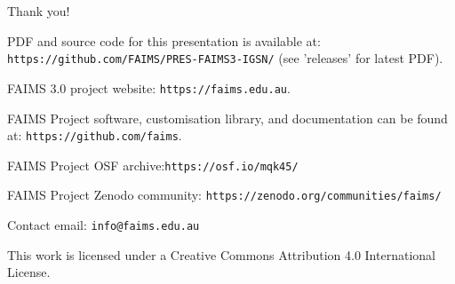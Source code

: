 
\begin{frame}{Thank you!}

    PDF and source code for this presentation is available at: 
    \texttt{https://github.com/FAIMS/PRES-FAIMS3-IGSN/} (see 'releases' for latest PDF).
    
    \medskip
    
    FAIMS 3.0 project website: \texttt{https://faims.edu.au}.
    
    \medskip
    
    FAIMS Project software, customisation library, and documentation can be found at:
    \texttt{https://github.com/faims}.
    
    \medskip
    
    FAIMS Project OSF archive:\texttt{https://osf.io/mqk45/}
    
    \medskip
    
    FAIMS Project Zenodo community: \texttt{https://zenodo.org/communities/faims/}
    
    \medskip
    Contact email: \texttt{info@faims.edu.au}
    
    \vfill
    
    This work is licensed under a Creative Commons Attribution 4.0 International License.

\end{frame}
